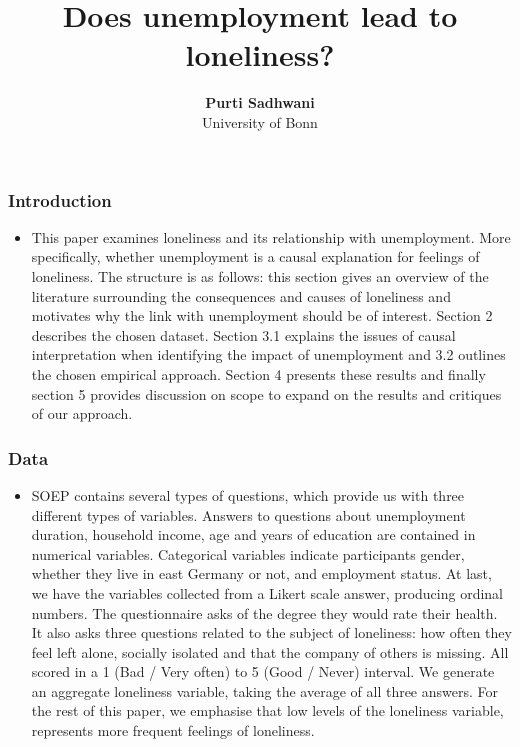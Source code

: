 \documentclass[11pt, aspectratio=169]{beamer}
\begin{document}
\title{Does unemployment lead to loneliness?}

\author[Purti Sadhwani]
{
{\bf Purti Sadhwani}\\
{\small University of Bonn}\\[1ex]}


\begin{frame}[t]
    \frametitle{Introduction}
    \begin{itemize}
    \item This paper examines loneliness and its relationship with unemployment. More specifically,
    whether unemployment is a causal explanation for feelings of loneliness\cite{cacioppo2008loneliness}. The structure is as
    follows: this section gives an overview of the literature surrounding the consequences and
    causes of loneliness and motivates why the link with unemployment should be of interest.
    Section 2 describes the chosen dataset. Section 3.1 explains the issues of causal interpretation when identifying the impact of unemployment and 3.2 outlines the chosen empirical
    approach. Section 4 presents these results and finally section 5 provides discussion on scope
    to expand on the results and critiques of our approach.
    \end{itemize}
    \note{~}
\end{frame}

\begin{frame}[t]
    \frametitle{Data}
     \begin{itemize}
           \item SOEP contains several types of questions, which provide us with three different types
            of variables. Answers to questions about unemployment duration, household income, age
            and years of education are contained in numerical variables. Categorical variables indicate
            participants gender, whether they live in east Germany or not, and employment status. At
            last, we have the variables collected from a Likert scale answer, producing ordinal numbers. The questionnaire asks of the degree they would rate their health. It also asks three
            questions related to the subject of loneliness: how often they feel left alone, socially isolated
            and that the company of others is missing. All scored in a 1 (Bad / Very often) to 5 (Good
            / Never) interval. We generate an aggregate loneliness variable, taking the average of all
            three answers. For the rest of this paper, we emphasise that low levels of the loneliness
            variable, represents more frequent feelings of loneliness.\cite{caliendo2008some}
     \end{itemize}
    \note{~}
\end{frame}
\end{document}
